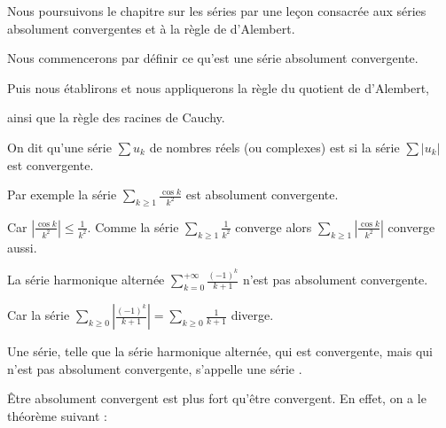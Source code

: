 






\debuttexte

\diapo

Nous poursuivons le chapitre sur les séries par une leçon consacrée aux séries absolument convergentes et à la règle de d'Alembert.

\change

\change
Nous commencerons par définir ce qu'est une série absolument convergente.

\change
Puis nous établirons et nous appliquerons la règle du quotient de d'Alembert, 

\change
ainsi que la règle des racines de Cauchy.

% 


\diapo

On dit qu'une série $\sum u_k$ de nombres réels (ou complexes) est 
 si la série $\sum |u_k|$ 
est convergente.  

\change
Par exemple la série $\sum_{k\ge1} \frac{\cos k}{k^2}$ est absolument convergente.

\change
Car $\left\vert\frac{\cos k}{k^2}\right\vert \le  \frac{1}{k^2}$. Comme la série $\sum_{k\ge1} \frac{1}{k^2}$ converge alors $\sum_{k\ge1} \left\vert\frac{\cos k}{k^2}\right\vert$ converge aussi.

\change
La série harmonique alternée $\sum_{k=0}^{+\infty} \frac{(-1)^k}{k+1}$  n'est pas absolument convergente. 

\change
Car la série $\sum_{k\ge0}  \left\vert\frac{(-1)^k}{k+1}\right\vert = \sum_{k\ge0} \frac{1}{k+1}$ diverge.

\change
Une série, telle que la série harmonique alternée, qui est convergente, 
mais qui n'est pas absolument convergente, s'appelle une série .

\diapo

\^Etre absolument convergent est plus fort qu'être convergent. En effet, on a le théorème suivant :


